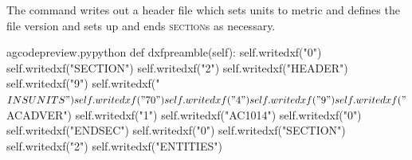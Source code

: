 \documentclass{ltxdoc}
\begin{document}
%
%
%

The  command writes out a header file which sets units to metric and defines the file version and sets up and ends \textsc{section}s as necessary.
 
\lstset{firstnumber=\thegcpy}
\begin{writecode}{a}{gcodepreview.py}{python}
    def dxfpreamble(self):
        self.writedxf("0")
        self.writedxf("SECTION")
        self.writedxf("2")
        self.writedxf("HEADER")
        self.writedxf("9")
        self.writedxf("$INSUNITS")
        self.writedxf("70")
        self.writedxf("4")
        self.writedxf("9")
        self.writedxf("$ACADVER")
        self.writedxf("1")
        self.writedxf("AC1014")
        self.writedxf("0")
        self.writedxf("ENDSEC")
        self.writedxf("0")
        self.writedxf("SECTION")
        self.writedxf("2")
        self.writedxf("ENTITIES")

\end{writecode}
\addtocounter{gcpy}{20}
\end{document}
